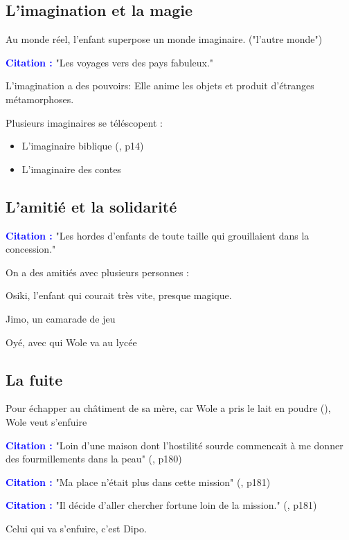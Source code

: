 \documentclass[a4paper, 11pt, hidelinks]{article}
\newcommand{\bs}{\bigskip}
\newcommand{\cit}{\large \textcolor{blue}{\textbf{Citation :}} \large }
\newcommand{\rb}[1]{\Romanbar{#1}}
\begin{document}
\subsection{L'imagination et la magie}


Au monde réel, l'enfant superpose un monde imaginaire. ("l'autre monde")

\cit "Les voyages vers des pays fabuleux." 

\bs

L'imagination a des pouvoirs: Elle anime les objets et produit d'étranges métamorphoses.

\bs

Plusieurs imaginaires se téléscopent : 

\begin{itemize}
    \item L'imaginaire biblique (\rb{1}, p14)
    \item L'imaginaire des contes
\end{itemize}



\subsection{L'amitié et la solidarité}

\cit "Les hordes d'enfants de toute taille qui grouillaient dans la concession."


On a des amitiés avec plusieurs personnes :


Osiki, l'enfant qui courait très vite, presque magique.

Jimo, un camarade de jeu

Oyé, avec qui Wole va au lycée


\subsection{La fuite}



Pour échapper au châtiment de sa mère, car Wole a pris le lait en poudre (\rb{6}), Wole veut s'enfuire

\cit "Loin d'une maison dont l'hostilité sourde commencait à me donner des fourmillements dans la peau" (\rb{6}, p180)

\cit "Ma place n'était plus dans cette mission" (\rb{6}, p181)

\cit "Il décide d'aller chercher fortune loin de la mission." (\rb{6}, p181)


\bs
Celui qui va s'enfuire, c'est Dipo.
\end{document}
